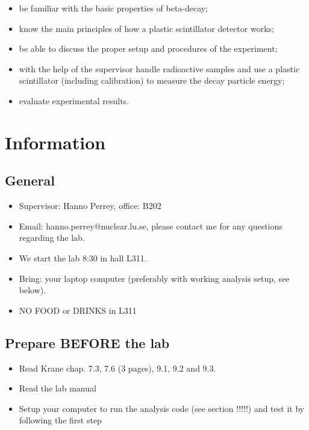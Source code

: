 \documentclass[a4,11pt, notitlepage]{article}
\begin{document}
\begin{itemize}
\item be familiar with the basic properties of beta-decay;
\item know the main principles of how a plastic scintillator detector works;
\item be able to discuss the proper setup and procedures of the experiment;
\item with the help of the supervisor handle radioactive samples and use a
  plastic scintillator (including calibration) to measure the decay particle energy;
\item evaluate experimental results.
\end{itemize}

\section{Information}


\subsection{General}

\begin{itemize}
\item Supervisor: Hanno Perrey, office: B202
\item Email: hanno.perrey@nuclear.lu.se, please contact me for any questions regarding the lab. 
\item We start the lab 8:30 in hall L311. 
\item Bring: your laptop computer (preferably with working
  analysis setup, see below). 
\item NO FOOD or DRINKS in L311
\end{itemize}



\subsection{Prepare BEFORE the lab}

\begin{itemize}
\item Read Krane chap. 7.3, 7.6 (3 pages), 9.1, 9.2 and 9.3. 
\item Read the lab manual
\item Setup your computer to run the analysis code (see section !!!!!)
  and test it by following the first step
\end{itemize}
\end{document}
